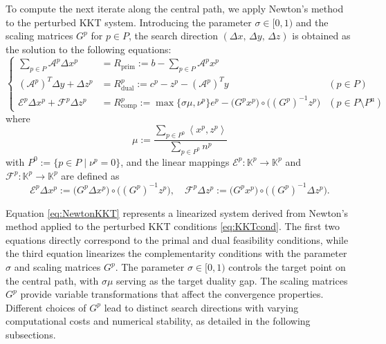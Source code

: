 To compute the next iterate along the central path, we apply Newton's method to the perturbed KKT system. 
Introducing the parameter $\sigma \in [0,1)$ and the scaling matrices $G^p$ for $p \in P$, the search direction $(\Delta x,\, \Delta y,\, \Delta z)$ is obtained as the solution to the following equations:
\begin{equation}
    \renewcommand{\arraystretch}{2.5}
    \left\{
    \begin{array}{rll}
         \sum_{p \in P} \mathcal{A}^p \Delta x^p & = R_{\text{prim}} := b - \sum_{p \in P} \mathcal{A}^p x^p &  \\
         (\mathcal{A}^p)^T \Delta y + \Delta z^p & = R_{\text{dual}}^p := c^p - z^p - (\mathcal{A}^p)^T y & (p \in P) \\
         \mathcal{E}^p \Delta x^p + \mathcal{F}^p \Delta z^p & = R_{\text{comp}}^p := \max\{\sigma \mu, \nu^p\} e^p - \big(G^p x^p\big) \circ \big((G^p)^{-1} z^p\big) & (p \in P \setminus P^{\text{u}})
    \end{array}
    \right.
    \label{eq:NewtonKKT}
\end{equation}
where 
\begin{equation}
  \mu := \frac{\sum_{p \in P^0} \left\langle x^p, z^p \right\rangle}
              {\sum_{p \in P^0} n^p}
  \label{eq:mu}
\end{equation}
with $P^0 := \{p\in P \mid \nu^p=0\}$, and the linear mappings $\mathcal{E}^p : \mathbb{K}^p \to \mathbb{K}^p$ and $\mathcal{F}^p : \mathbb{K}^p \to \mathbb{K}^p$ are defined as
\[
  \mathcal{E}^p \Delta x^p
    := \big(G^p \Delta x^p\big) \circ \big((G^p)^{-1} z^p\big),
  \quad
  \mathcal{F}^p \Delta z^p
    := \big(G^p x^p\big) \circ \big((G^p)^{-1} \Delta z^p\big).
\]

Equation \eqref{eq:NewtonKKT} represents a linearized system derived from Newton's method applied to the perturbed KKT conditions \eqref{eq:KKTcond}. 
The first two equations directly correspond to the primal and dual feasibility conditions, while the third equation linearizes the complementarity conditions with the parameter $\sigma$ and scaling matrices $G^p$.
The parameter $\sigma \in [0,1)$ controls the target point on the central path, with $\sigma \mu$ serving as the target duality gap.
The scaling matrices $G^p$ provide variable transformations that affect the convergence properties. 
Different choices of $G^p$ lead to distinct search directions with varying computational costs and numerical stability, as detailed in the following subsections.


